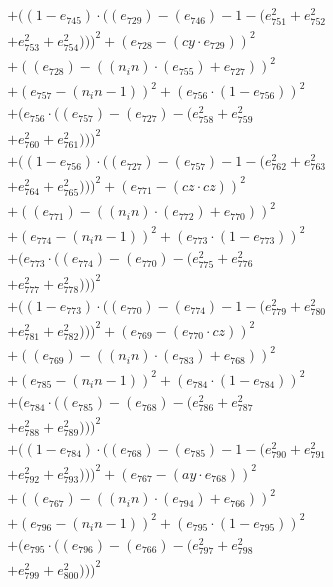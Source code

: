 \documentclass[10pt, a4paper]{article}
\begin{document}
\begin{align*}
& + ((1 - e_{745})  \cdot  ((e_{729}) - (e_{746}) - 1 - (e_{751}^{2} + e_{752}^{2} \\
& + e_{753}^{2} + e_{754}^{2})))^{2} + (e_{728} - (cy  \cdot  e_{729}))^{2} \\
& + ((e_{728}) - ((n_in)  \cdot  (e_{755}) + e_{727}))^{2} \\
& + (e_{757} - (n_in - 1))^{2} + (e_{756}  \cdot  (1 - e_{756}))^{2} \\
& + (e_{756}  \cdot  ((e_{757}) - (e_{727}) - (e_{758}^{2} + e_{759}^{2} \\
& + e_{760}^{2} + e_{761}^{2})))^{2} \\
& + ((1 - e_{756})  \cdot  ((e_{727}) - (e_{757}) - 1 - (e_{762}^{2} + e_{763}^{2} \\
& + e_{764}^{2} + e_{765}^{2})))^{2} + (e_{771} - (cz  \cdot  cz))^{2} \\
& + ((e_{771}) - ((n_in)  \cdot  (e_{772}) + e_{770}))^{2} \\
& + (e_{774} - (n_in - 1))^{2} + (e_{773}  \cdot  (1 - e_{773}))^{2} \\
& + (e_{773}  \cdot  ((e_{774}) - (e_{770}) - (e_{775}^{2} + e_{776}^{2} \\
& + e_{777}^{2} + e_{778}^{2})))^{2} \\
& + ((1 - e_{773})  \cdot  ((e_{770}) - (e_{774}) - 1 - (e_{779}^{2} + e_{780}^{2} \\
& + e_{781}^{2} + e_{782}^{2})))^{2} + (e_{769} - (e_{770}  \cdot  cz))^{2} \\
& + ((e_{769}) - ((n_in)  \cdot  (e_{783}) + e_{768}))^{2} \\
& + (e_{785} - (n_in - 1))^{2} + (e_{784}  \cdot  (1 - e_{784}))^{2} \\
& + (e_{784}  \cdot  ((e_{785}) - (e_{768}) - (e_{786}^{2} + e_{787}^{2} \\
& + e_{788}^{2} + e_{789}^{2})))^{2} \\
& + ((1 - e_{784})  \cdot  ((e_{768}) - (e_{785}) - 1 - (e_{790}^{2} + e_{791}^{2} \\
& + e_{792}^{2} + e_{793}^{2})))^{2} + (e_{767} - (ay  \cdot  e_{768}))^{2} \\
& + ((e_{767}) - ((n_in)  \cdot  (e_{794}) + e_{766}))^{2} \\
& + (e_{796} - (n_in - 1))^{2} + (e_{795}  \cdot  (1 - e_{795}))^{2} \\
& + (e_{795}  \cdot  ((e_{796}) - (e_{766}) - (e_{797}^{2} + e_{798}^{2} \\
& + e_{799}^{2} + e_{800}^{2})))^{2} \\

\end{align*}
\end{document}
